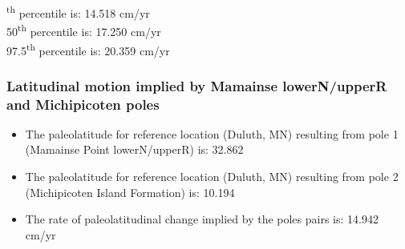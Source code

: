 \documentclass{article}
\begin{document}
    \begin{center}
    \end{center}
    
    \begin{figure}[h]
    \centering
    \end{figure}
    
\textsuperscript{th} percentile is: 14.518 cm/yr\\
50\textsuperscript{th} percentile is: 17.250 cm/yr\\
97.5\textsuperscript{th} percentile is: 20.359 cm/yr\\


\newpage

\subsubsection{Latitudinal motion implied by Mamainse lowerN/upperR and Michipicoten poles}\label{MamainseMichipicotenRate}

\begin{itemize}
\item{The paleolatitude for reference location (Duluth, MN) resulting from pole 1 (Mamainse Point lowerN/upperR) is: 32.862\textdegree}
\item{The paleolatitude for reference location (Duluth, MN) resulting from pole 2 (Michipicoten Island Formation) is: 10.194\textdegree}
\item{The rate of paleolatitudinal change implied by the poles pairs is: 14.942 cm/yr}
\end{itemize}

    \begin{center}
    \end{center}
    
    \begin{figure}[h]
    \centering
    \end{figure}
    
\end{document}
